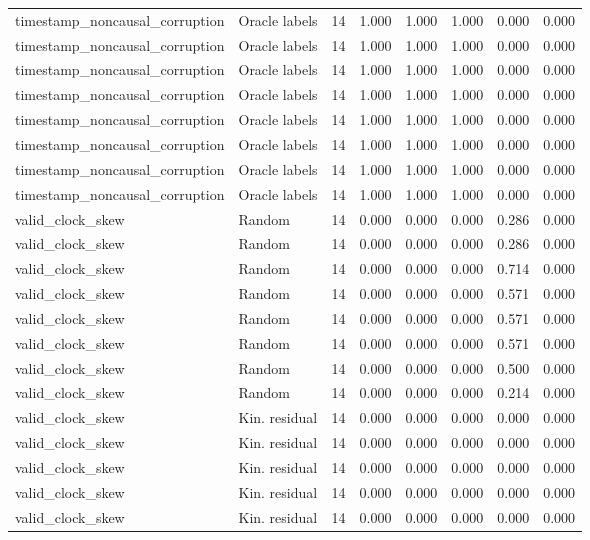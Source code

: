 {\begin{longtable}{llrrrrrr}
timestamp\_noncausal\_corruption & Oracle labels & 14 & 1.000 & 1.000 & 1.000 & 0.000 & 0.000 \\
timestamp\_noncausal\_corruption & Oracle labels & 14 & 1.000 & 1.000 & 1.000 & 0.000 & 0.000 \\
timestamp\_noncausal\_corruption & Oracle labels & 14 & 1.000 & 1.000 & 1.000 & 0.000 & 0.000 \\
timestamp\_noncausal\_corruption & Oracle labels & 14 & 1.000 & 1.000 & 1.000 & 0.000 & 0.000 \\
timestamp\_noncausal\_corruption & Oracle labels & 14 & 1.000 & 1.000 & 1.000 & 0.000 & 0.000 \\
timestamp\_noncausal\_corruption & Oracle labels & 14 & 1.000 & 1.000 & 1.000 & 0.000 & 0.000 \\
timestamp\_noncausal\_corruption & Oracle labels & 14 & 1.000 & 1.000 & 1.000 & 0.000 & 0.000 \\
timestamp\_noncausal\_corruption & Oracle labels & 14 & 1.000 & 1.000 & 1.000 & 0.000 & 0.000 \\
valid\_clock\_skew & Random & 14 & 0.000 & 0.000 & 0.000 & 0.286 & 0.000 \\
valid\_clock\_skew & Random & 14 & 0.000 & 0.000 & 0.000 & 0.286 & 0.000 \\
valid\_clock\_skew & Random & 14 & 0.000 & 0.000 & 0.000 & 0.714 & 0.000 \\
valid\_clock\_skew & Random & 14 & 0.000 & 0.000 & 0.000 & 0.571 & 0.000 \\
valid\_clock\_skew & Random & 14 & 0.000 & 0.000 & 0.000 & 0.571 & 0.000 \\
valid\_clock\_skew & Random & 14 & 0.000 & 0.000 & 0.000 & 0.571 & 0.000 \\
valid\_clock\_skew & Random & 14 & 0.000 & 0.000 & 0.000 & 0.500 & 0.000 \\
valid\_clock\_skew & Random & 14 & 0.000 & 0.000 & 0.000 & 0.214 & 0.000 \\
valid\_clock\_skew & Kin. residual & 14 & 0.000 & 0.000 & 0.000 & 0.000 & 0.000 \\
valid\_clock\_skew & Kin. residual & 14 & 0.000 & 0.000 & 0.000 & 0.000 & 0.000 \\
valid\_clock\_skew & Kin. residual & 14 & 0.000 & 0.000 & 0.000 & 0.000 & 0.000 \\
valid\_clock\_skew & Kin. residual & 14 & 0.000 & 0.000 & 0.000 & 0.000 & 0.000 \\
valid\_clock\_skew & Kin. residual & 14 & 0.000 & 0.000 & 0.000 & 0.000 & 0.000 \\

\end{longtable}}
